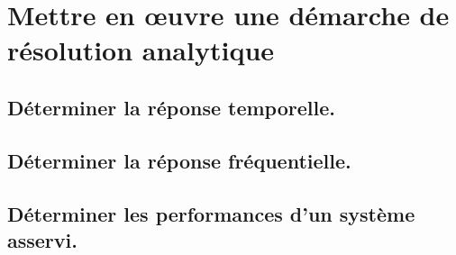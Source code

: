 \documentclass[10pt,fleqn]{book}
\newcommand{\repRel}{../..}
\newcommand{\repStyle}{\repRel/Style}
\newcommand{\td}{fichier_td}
\newcommand{\repExos}{\repRel/ExercicesCompetences}
\newcommand{\repExo}{dossier}
\begin{document}
\renewcommand{\repExo}{\repExos/C1_ProposerDemarche/C1_05_ProposerDemarcheActionMecaLoiMvt_PFS/STOCK/06_TR_02}
\renewcommand{\td}{06_TR_02}
\graphicspath{{\repStyle/png/}{\repExo/images/}}


\renewcommand{\repExo}{\repExos/C1_ProposerDemarche/C1_05_ProposerDemarcheActionMecaLoiMvt_PFS/STOCK/07_RR3D_02}
\renewcommand{\td}{07_RR3D_02}
\graphicspath{{\repStyle/png/}{\repExo/images/}}


\renewcommand{\repExo}{\repExos/C1_ProposerDemarche/C1_05_ProposerDemarcheActionMecaLoiMvt_PFS/STOCK/08_RR3D_02}
\renewcommand{\td}{08_RR3D_02}
\graphicspath{{\repStyle/png/}{\repExo/images/}}


\renewcommand{\repExo}{\repExos/C1_ProposerDemarche/C1_05_ProposerDemarcheActionMecaLoiMvt_PFS/STOCK/09_RT_RSG}
\renewcommand{\td}{09_RT_RSG}
\graphicspath{{\repStyle/png/}{\repExo/images/}}


\section{Mettre en œuvre une démarche de résolution analytique} 

\subsection{Déterminer la réponse temporelle.} 

\subsection{Déterminer la réponse fréquentielle. } 

\renewcommand{\repExo}{\repExos/C2_MettreEnOeuvreDemarche/C2_02_DiagrammeBode/510_Divers}
\renewcommand{\td}{510_Divers}
\graphicspath{{\repStyle/png/}{\repExo/images/}}


\renewcommand{\repExo}{\repExos/C2_MettreEnOeuvreDemarche/C2_02_DiagrammeBode/511_Divers}
\renewcommand{\td}{511_Divers}
\graphicspath{{\repStyle/png/}{\repExo/images/}}


\subsection{Déterminer les performances d'un système asservi.} 

\renewcommand{\repExo}{\repExos/C2_MettreEnOeuvreDemarche/C2_03_PerformancesSLCI/501_Divers}
\renewcommand{\td}{501_Divers}
\graphicspath{{\repStyle/png/}{\repExo/images/}}

\end{document}
